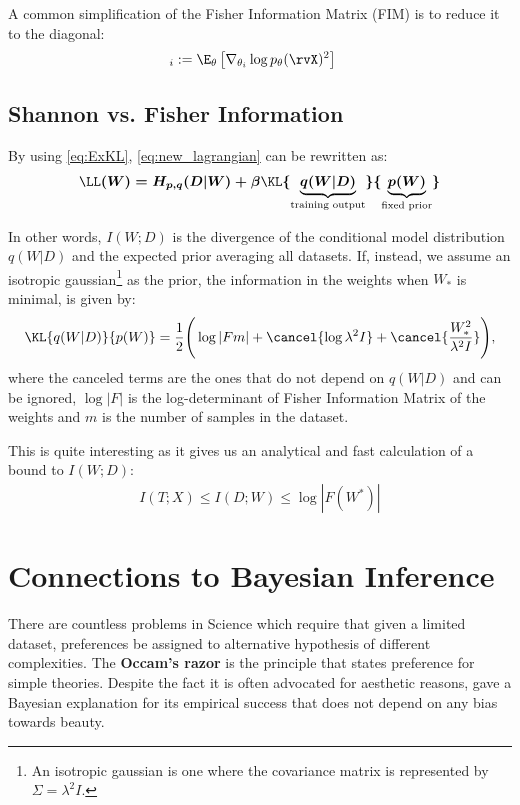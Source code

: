 A common simplification of the Fisher Information Matrix (FIM) is to reduce it to the diagonal:
\begin{align}
	[I_{\rvX}(\theta)]_{i} &:= \E_{\theta} \left[ \nabla_{\theta_i} \log p_{\theta}(\rvX)^2 \right]
\end{align}
\subsection{Shannon vs. Fisher Information}
By using \eqref{eq:ExKL}, \eqref{eq:new_lagrangian} can be rewritten as:
\begin{align*}
  \boldsymbol{\LL(W) = H_{p,q}(D|W) +\beta \KL{\underbrace{q(W|D)}_{\text{training output}}}{\underbrace{p(W)}_{\text{fixed prior}}}}
\end{align*}

In other words, $I(W;D)$ is the divergence of the conditional model distribution $q(W|D)$ and the expected prior averaging all datasets. If, instead, we assume an isotropic gaussian\footnote{An isotropic gaussian is one where the covariance matrix is represented by $\Sigma=\lambda^2 I$.} as the prior, the information in the weights when $W_*$ is minimal, is given by:
\begin{align*}
  \KL{q(W|D)}{p(W)}=\frac{1}{2} \Bigg(\log |F m|+\cancel{\log \lambda^2I} + \cancel{\frac{W_*^2}{\lambda^2I}} \Bigg),
\end{align*}
where the canceled terms are the ones that do not depend on $q(W|D)$ and can be ignored, $\log |F|$ is the log-determinant of Fisher Information Matrix of the weights and $m$ is the number of samples in the dataset.

This is quite interesting as it gives us an analytical and fast calculation of a  bound to $I(W;D)$:
\begin{align}
I(T;X) \leq I(D;W) \leq \log |F(W^*)| \label{bounds}
\end{align}
\section{Connections to Bayesian Inference}
There are countless problems in Science which require that given a limited dataset, preferences be assigned to alternative hypothesis of different complexities. The \textbf{Occam's razor} is the principle that states preference for simple theories. Despite the fact it is often advocated for aesthetic reasons, \citeauthor{mackay:2002} gave a Bayesian explanation for its empirical success that does not depend on any bias towards beauty\cite{mackay:2002}.

